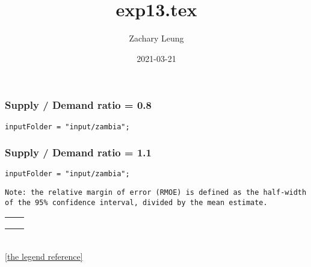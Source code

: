\documentclass[12pt]{article}
\title{exp13.tex}
\author{Zachary Leung}
\date{2021-03-21}
\begin{document}
\maketitle




\subsubsection*{Supply / Demand ratio = 0.8}
\begin{verbatim}
inputFolder = "input/zambia";
\end{verbatim}


\subsubsection*{Supply / Demand ratio = 1.1}
\begin{verbatim}
inputFolder = "input/zambia";
\end{verbatim}



%

\begin{verbatim}
Note: the relative margin of error (RMOE) is defined as the half-width
of the 95% confidence interval, divided by the mean estimate.
\end{verbatim}








\clearpage
\pgfplotsset{width=10cm,height=9cm}
\begin{center}
\begin{tabular}{MM}
%
&
%
\\[5mm]
%
&
%
\\[5mm]
%
&
%
\end{tabular}
~\\[5mm]
\ref{the legend reference}
\end{center}
\end{document}
